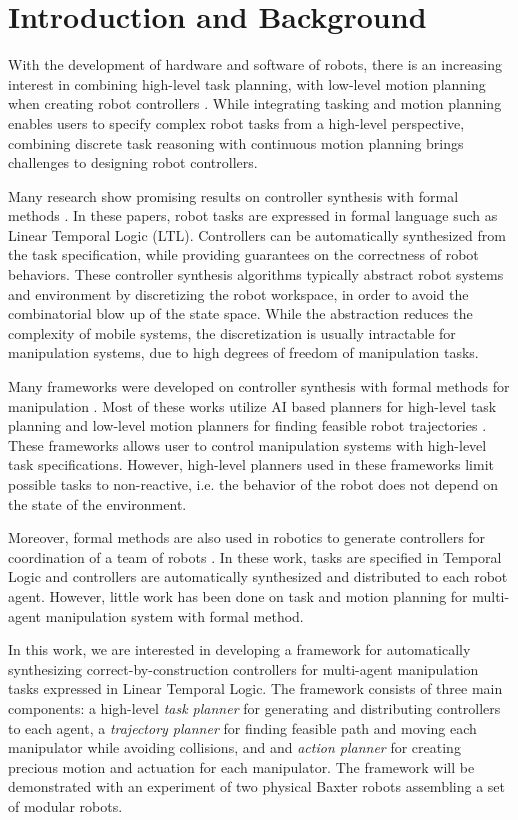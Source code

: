 \section{Introduction and Background}
With the development of hardware and software of robots,
there is an increasing interest in combining high-level task planning,
with low-level motion planning when creating robot controllers \cite{HKG2009,Belta2008,Bhatia2011,Dornhege2009,Erdem2011,Tom2014,Srivastava2014}.
While integrating tasking and motion planning enables users to specify complex robot tasks from a high-level perspective,
combining discrete task reasoning with continuous motion planning brings challenges to designing robot controllers.

Many research show promising results on controller synthesis with formal methods \cite{HKG2009,Belta2008,Bhatia2011,Wongpiromsarn,Maly,Vasile}.
In these papers, robot tasks are expressed in formal language such as Linear Temporal Logic (LTL).
Controllers can be automatically synthesized from the task specification,
while providing guarantees on the correctness of robot behaviors.
These controller synthesis algorithms typically abstract robot systems and environment by discretizing the robot workspace,
in order to avoid the combinatorial blow up of the state space.
While the abstraction reduces the complexity of mobile systems,
the discretization is usually intractable for manipulation systems,
due to high degrees of freedom of manipulation tasks.

Many frameworks were developed on controller synthesis with formal methods for manipulation \cite{Dornhege2009,Erdem2011,Tom2014,Srivastava2014,CambonAG09,KaelblingL11,PlakuH10,HeLKV15}.
Most of these works utilize AI based planners for high-level task planning and low-level motion planners for finding feasible robot trajectories \cite{Nau,Hoffmann01}.
These frameworks allows user to control manipulation systems with high-level task specifications.
However, high-level planners used in these frameworks limit possible tasks to non-reactive,
i.e. the behavior of the robot does not depend on the state of the environment.

Moreover, formal methods are also used in robotics to generate controllers for coordination of a team of robots \cite{ChenDSB12,KaramanF08,GuoTD14,VasileB14}.
In these work, tasks are specified in Temporal Logic and controllers are automatically synthesized and distributed to each robot agent. 
However, little work has been done on task and motion planning for multi-agent manipulation system with formal method.

In this work, we are interested in developing a framework for automatically synthesizing correct-by-construction controllers
for multi-agent manipulation tasks expressed in Linear Temporal Logic. The framework consists of three main components:
a high-level {\it task planner} for generating and distributing controllers to each agent,
a {\it trajectory planner} for finding feasible path and moving each manipulator while avoiding collisions,
and and {\it action planner} for creating precious motion and actuation for each manipulator.
The framework will be demonstrated with an experiment of two physical Baxter robots assembling a set of modular robots. 


